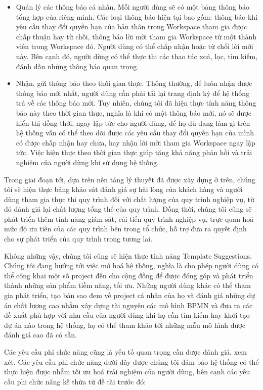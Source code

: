 \begin{itemize}
    \item Quản lý các thông báo cá nhân. Mỗi người dùng sẽ có một bảng thông báo tổng hợp
          của riêng mình. Các loại thông báo hiện tại bao gồm: thông báo khi yêu cầu thay đổi quyền hạn của bản thân trong
          Workspace tham gia được chấp thuận hay từ chối, thông báo lời mời tham gia
          Workspace từ một thành viên trong Workspace đó. Người dùng có thể chấp nhận
          hoặc từ chối lời mời này. Bên cạnh đó, người dùng có thể thực thi các thao tác
          xoá, lọc, tìm kiếm, đánh dấu những thông báo quan trọng.
    \item Nhận, gửi thông báo theo thời gian thực. Thông thường, để luôn nhận được thông
          báo mới nhất, người dùng cần phải tải lại trang định kỳ để hệ thống trả về các
          thông báo mới. Tuy nhiên, chúng tôi đã hiện thực tính năng thông báo này
          theo thời gian thực, nghĩa là khi có một thông báo mới, nó sẽ được hiển thị
          đồng thời, ngay lập tức cho người dùng, để họ dù đang làm gì trên hệ thống vẫn
          có thể theo dõi được các yêu cầu thay đổi quyền hạn của mình có được chấp nhận hay chưa, hay nhận
          lời mời tham gia Workspace ngay lập tức. Việc hiện thực theo thời gian thực
          giúp tăng khả năng phản hồi và trải nghiệm của người dùng khi sử dụng hệ thống.
\end{itemize}
\par
Trong giai đoạn tới, dựa trên nền tảng lý thuyết đã được xây dựng ở trên, chúng tôi
sẽ hiện thực bảng khảo sát đánh giá sự hài lòng của khách hàng và người dùng tham gia
thực thi quy trình đối với chất lượng của quy trình nghiệp vụ, từ đó đánh giá lại chất
lượng tổng thể của quy trình. Đồng thời, chúng tôi cũng sẽ phát triển thêm tính năng
giám sát, cải tiến quy trình nghiệp vụ, trực quan hoá mức độ ưu tiên của các quy trình
bên trong tổ chức, hỗ trợ đưa ra quyết định cho sự phát triển của quy trình trong tương lai.
\par
Không những vậy, chúng tôi cũng sẽ hiện thực tính năng Template Suggestions. 
Chúng tôi đang hướng tới việc mở hoá hệ thống, nghĩa là cho phép người dùng có thể 
công khai một số project đến cho cộng đồng để được đóng góp và phát triển thành 
những sản phẩm tiềm năng, tối ưu. Những người dùng khác có thể tham gia phát triển, 
tạo bản sao đem về project cá nhân của họ và đánh giá những dự án chất lượng cao 
nhằm xây dựng tài nguyên các mô hình BPMN và đưa ra các đề xuất phù hợp với nhu 
cầu của người dùng khi họ cần tìm kiếm hay khởi tạo dự án nào trong hệ thống, họ 
có thể tham khảo tới những mẫu mô hình được đánh giá cao đã có sẵn.
\par
Các yêu cầu phi chức năng cũng là yếu tố quan trọng cần được đánh giá, xem xét.
Các yêu cầu phi chức năng dưới đây được chúng tôi đảm bảo hệ thống có thể thực
hiện được nhằm tối ưu hoá trải nghiệm của người dùng, bên cạnh các yêu cầu phi
chức năng kế thừa từ đề tài trước đó:

